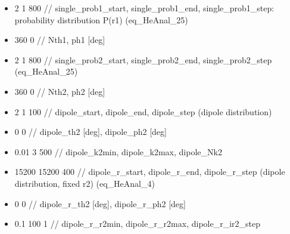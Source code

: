 \begin{itemize}
\item 2 1 800         // single_prob1_start, single_prob1_end, single_prob1_step: probability distribution P(\vec r1) (eq_HeAnal_25)
\item 360   0         // Nth1, ph1 [deg]

\item 2 1 800         // single_prob2_start, single_prob2_end, single_prob2_step (eq_HeAnal_25)
\item 360   0         // Nth2, ph2 [deg]

\item 2 1 100         // dipole_start, dipole_end, dipole_step (dipole distribution)
\item 0   0           // dipole_th2 [deg], dipole_ph2 [deg]
\item 0.01 3 500      // dipole_k2min, dipole_k2max, dipole_Nk2

\item 15200 15200 400 // dipole_r_start, dipole_r_end, dipole_r_step (dipole distribution, fixed r2) (eq_HeAnal_4)
\item 0    0          // dipole_r_th2 [deg], dipole_r_ph2 [deg]
\item 0.1 100 1       // dipole_r_r2min, dipole_r_r2max, dipole_r_ir2_step
\end{itemize}
